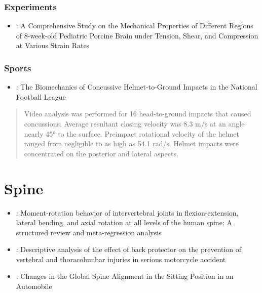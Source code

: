 \documentclass[]{book}
\providecommand{\tightlist}{%
  \setlength{\itemsep}{0pt}\setlength{\parskip}{0pt}}
\begin{document}
\hypertarget{experiments}{%
\subsection{Experiments}\label{experiments}}

\begin{itemize}
\tightlist
\item
  \citet{Li2019}: A Comprehensive Study on the Mechanical Properties of Different Regions of 8-week-old Pediatric Porcine Brain under Tension, Shear, and Compression at Various Strain Rates
\end{itemize}

\hypertarget{sports}{%
\subsection{Sports}\label{sports}}

\begin{itemize}
\tightlist
\item
  \citet{Kent2019}: The Biomechanics of Concussive Helmet-to-Ground Impacts in the National Football League
\end{itemize}

\begin{quote}
Video analysis was performed for 16 head-to-ground impacts that caused concussions. Average resultant closing velocity was 8.3 m/s at an angle nearly 45° to the surface. Preimpact rotational velocity of the helmet ranged from negligible to as high as 54.1 rad/s. Helmet impacts were concentrated on the posterior and lateral aspects.
\end{quote}

\hypertarget{spine}{%
\chapter{Spine}\label{spine}}

\begin{itemize}
\item
  \citet{Zhang2020}: Moment-rotation behavior of intervertebral joints in flexion-extension, lateral bending, and axial rotation at all levels of the human spine: A structured review and meta-regression analysis
\item
  \citet{Afquir2020}: Descriptive analysis of the effect of back protector on the prevention of vertebral and thoracolumbar injuries in serious motorcycle accident
\item
  \citet{Nishida2019}: Changes in the Global Spine Alignment in the Sitting Position in an Automobile
\end{itemize}
\end{document}
